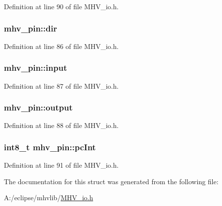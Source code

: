 Definition at line 90 of file M\-H\-V\-\_\-io.\-h.

\hypertarget{structmhv__pin_a117d8f9276e86e32a04f51d19a097ff1}{
\subsubsection[{dir}]{ mhv\-\_\-pin\-::dir}}\label{structmhv__pin_a117d8f9276e86e32a04f51d19a097ff1}


Definition at line 86 of file M\-H\-V\-\_\-io.\-h.

\hypertarget{structmhv__pin_aeeff3be931278e9976a842d922405f78}{
\subsubsection[{input}]{ mhv\-\_\-pin\-::input}}\label{structmhv__pin_aeeff3be931278e9976a842d922405f78}


Definition at line 87 of file M\-H\-V\-\_\-io.\-h.

\hypertarget{structmhv__pin_ade591e6f7c3f52c5b1472b05ecc6248e}{
\subsubsection[{output}]{ mhv\-\_\-pin\-::output}}\label{structmhv__pin_ade591e6f7c3f52c5b1472b05ecc6248e}


Definition at line 88 of file M\-H\-V\-\_\-io.\-h.

\hypertarget{structmhv__pin_a10252efa71e71a7e0e5ddb1d184c7101}{
\subsubsection[{pc\-Int}]{\setlength{\rightskip}{0pt plus 5cm}int8\-\_\-t mhv\-\_\-pin\-::pc\-Int}}\label{structmhv__pin_a10252efa71e71a7e0e5ddb1d184c7101}


Definition at line 91 of file M\-H\-V\-\_\-io.\-h.



The documentation for this struct was generated from the following file\-:\begin{DoxyCompactItemize}
\item 
A\-:/eclipse/mhvlib/\hyperlink{_m_h_v__io_8h}{M\-H\-V\-\_\-io.\-h}\end{DoxyCompactItemize}
